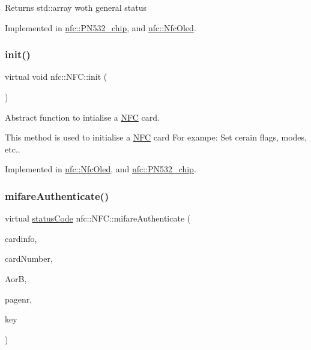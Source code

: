\begin{DoxyReturn}{Returns}
std\+::array woth general status 
\end{DoxyReturn}


Implemented in \hyperlink{classnfc_1_1PN532__chip_a9ffef9f3b2982346499703361c6e7d5c}{nfc\+::\+P\+N532\+\_\+chip}, and \hyperlink{classnfc_1_1NfcOled_a037638d75c50a76c7f62d0e69cb44cdb}{nfc\+::\+Nfc\+Oled}.

\mbox{\label{classnfc_1_1NFC_a9893c1b762ed0c6796afcde7733bd8cc}} 
\subsubsection{\texorpdfstring{init()}{init()}}
{\footnotesize\ttfamily virtual void nfc\+::\+N\+F\+C\+::init (\begin{DoxyParamCaption}{ }\end{DoxyParamCaption})\hspace{0.3cm}{\ttfamily [pure virtual]}}



Abstract function to intialise a \hyperlink{classnfc_1_1NFC}{N\+FC} card. 

This method is used to initialise a \hyperlink{classnfc_1_1NFC}{N\+FC} card For exampe\+: Set cerain flags, modes, etc.. 

Implemented in \hyperlink{classnfc_1_1NfcOled_a2b394a955afe3f280e3f2509908effe9}{nfc\+::\+Nfc\+Oled}, and \hyperlink{classnfc_1_1PN532__chip_ab2eecf84902eedff7e7b5fae0c562804}{nfc\+::\+P\+N532\+\_\+chip}.

\mbox{\label{classnfc_1_1NFC_a1a6dc3144b89ea1df4ac47b1d2e476d2}} 
\subsubsection{\texorpdfstring{mifare\+Authenticate()}{mifareAuthenticate()}}
{\footnotesize\ttfamily virtual \hyperlink{declarations_8h_ae1d20c5a38cae82ccaa6a77be3fd264b}{status\+Code} nfc\+::\+N\+F\+C\+::mifare\+Authenticate (\begin{DoxyParamCaption}\item[{\hyperlink{classcard}{card} \&}]{cardinfo,  }\item[{const uint8\+\_\+t}]{card\+Number,  }\item[{const \hyperlink{declarations_8h_a305b1a3bcfca65e2a82f0f9d24676835}{mifare\+Commands}}]{AorB,  }\item[{const uint8\+\_\+t}]{pagenr,  }\item[{const uint8\+\_\+t $\ast$}]{key }\end{DoxyParamCaption})\hspace{0.3cm}{\ttfamily [pure virtual]}}




